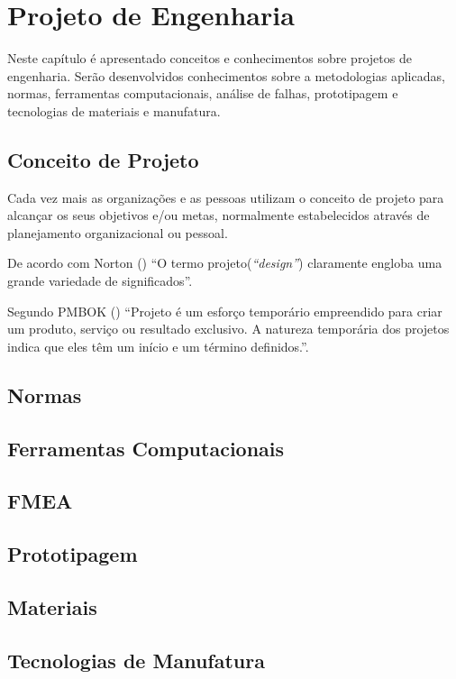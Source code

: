 \chapter[Projeto de Engenharia]{Projeto de Engenharia\label{cap:projeto}}
Neste capítulo é apresentado conceitos e conhecimentos sobre projetos de engenharia. Serão desenvolvidos conhecimentos sobre a metodologias aplicadas, normas, ferramentas computacionais, análise de falhas, prototipagem e tecnologias de materiais e manufatura.

\section{Conceito de Projeto}
Cada vez mais as organizações e as pessoas utilizam o conceito de projeto para alcançar os seus objetivos e/ou metas, normalmente estabelecidos através de planejamento organizacional ou pessoal.
\par
De acordo com Norton (\citeyear{nort13}) ``O termo projeto(\textit{``design''}) claramente engloba uma grande variedade de significados''.
\par
Segundo \uppercase{pmbok\textregistered} (\citeyear{pmbok13}) ``Projeto é um esforço temporário empreendido para criar um produto, serviço ou resultado exclusivo. A natureza temporária dos projetos indica que eles têm um início e um término definidos.''.



\section{Normas}
\section{Ferramentas Computacionais}
\section{FMEA}
\section{Prototipagem}
\section{Materiais}
\section{Tecnologias de Manufatura}